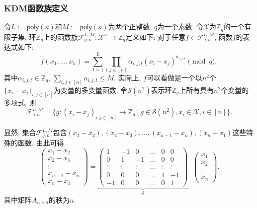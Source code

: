 \subsubsection{KDM函数族定义}\label{sec:ch5-Function}
令$L := \mathsf{poly}(\kappa)$和$M := \mathsf{poly}(\kappa)$为两个正整数, $q$为一个素数. 令$\mathcal{X}$为$\mathbb{Z}_q$的一个有限子集. 环$\mathbb{Z}_q$上的函数族$\mathcal{F}_{q, n}^{L, M}: \mathcal{X}^n \rightarrow \mathbb{Z}_q$定义如下: 对于任意$f \in \mathcal{F}_{q,n}^{L,M}$, 函数$f$的表达式如下: 
\begin{displaymath}
f(x_1, \ldots, x_n) = \sum_{t=1}^{L} \prod_{i, j \in [n]}\alpha_{i, j, t}(x_i - x_j)^{a_{i, j, t}}\pmod q,
\end{displaymath}
其中$\alpha_{i, j, t} \in \mathbb{Z}_q$, $\sum_{i, j \in [n]}a_{i, j, t} \leq M$. 实际上, $f$可以看做是一个以$n^2$个$\{x_i - x_j\}_{i, j\in [n]}$为变量的多变量函数. 令$\mathcal{S}(n^2)$表示环$\mathbb{Z}_q$上所有具有$n^2$个变量的多项式, 则
\[
\mathcal{F}_{q, n}^{L, M} = \{g: (x_i - x_j)_{i, j \in [n]} \rightarrow \mathbb{Z}_q ~|~  g \in \mathcal{S}(n^2), x_i \in \mathcal{X}, i\in [n]\}.
\]

显然, 集合$\mathcal{F}_{q, n}^{L, M}$包含$(x_1 - x_2), (x_2 - x_3), \ldots, (x_{n-1} - x_n),(x_n - x_1)$这些特殊的函数. 由此可得
\begin{displaymath}
   \left( \begin{array}{c}
      x_1 - x_2      \\
      x_2 - x_3      \\
      \vdots         \\
      x_{n-1} - x_n  \\
      x_n-x_1
    \end{array}\right)=\underbrace{\left(\begin{array}{cccccc}
                  1      & -1     & 0      &\ldots  & 0      & 0      \\
                  0      & 1      & -1     &\ldots  & 0      & 0      \\
                  \vdots & \vdots & \vdots & \ldots & \vdots & \vdots \\
                  0      & 0      & 0      &\ldots  & 1      & -1     \\
                 -1      & 0      & 0      &\ldots  & 0      & 1
                \end{array}\right)}_{A}\cdot
                \left(\begin{array}{c}
                  x_1     \\
                  x_2     \\
                  \vdots  \\
                  x_n
                \end{array}\right).
    \end{displaymath}
其中矩阵$A_{n \times n}$的秩为$n$.


